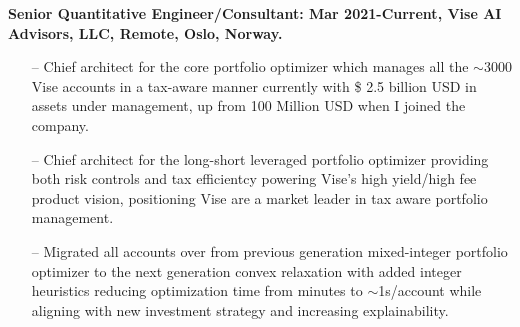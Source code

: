 \documentclass[letterpaper, 12pt]{article}
\renewenvironment{itemize}{
  \begin{list}{}{
    \setlength{\leftmargin}{1.5em}
  }
}{
  \end{list}
}
\begin{document}
\begin{itemize}
  \item \textbf{Senior Quantitative Engineer/Consultant: Mar 2021-Current, Vise AI Advisors, LLC, Remote, Oslo, Norway. }
  \begin{enumerate}
       \item[--] Chief architect for the core portfolio optimizer which manages all the $\sim$3000 Vise accounts in a tax-aware manner currently with \$ 2.5 billion USD in assets under management, up from 100 Million USD when I joined the company. 
       \item[--] Chief architect for the long-short leveraged portfolio optimizer providing both risk controls and tax efficientcy powering Vise's high yield/high fee product vision, positioning Vise are a market leader in tax aware portfolio management.
       \item[--] Migrated all accounts over from previous generation mixed-integer portfolio optimizer to the next generation convex relaxation with added integer heuristics reducing optimization time from minutes to $\sim$1s/account while aligning with new investment strategy and increasing explainability.
   \end{enumerate}
  

\end{itemize}
\end{document}
